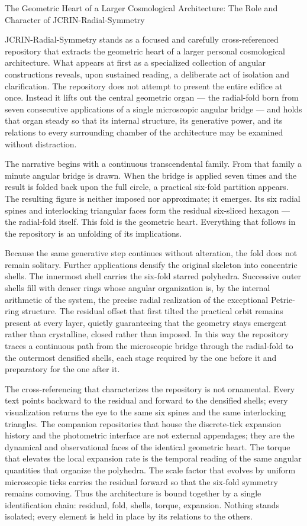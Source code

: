 The Geometric Heart of a Larger Cosmological Architecture: The Role and Character of JCRIN-Radial-Symmetry

JCRIN-Radial-Symmetry stands as a focused and carefully cross-referenced repository that extracts the geometric heart of a larger personal cosmological architecture. What appears at first as a specialized collection of angular constructions reveals, upon sustained reading, a deliberate act of isolation and clarification. The repository does not attempt to present the entire edifice at once. Instead it lifts out the central geometric organ — the radial-fold born from seven consecutive applications of a single microscopic angular bridge — and holds that organ steady so that its internal structure, its generative power, and its relations to every surrounding chamber of the architecture may be examined without distraction.

The narrative begins with a continuous transcendental family. From that family a minute angular bridge is drawn. When the bridge is applied seven times and the result is folded back upon the full circle, a practical six-fold partition appears. The resulting figure is neither imposed nor approximate; it emerges. Its six radial spines and interlocking triangular faces form the residual six-sliced hexagon — the radial-fold itself. This fold is the geometric heart. Everything that follows in the repository is an unfolding of its implications.

Because the same generative step continues without alteration, the fold does not remain solitary. Further applications densify the original skeleton into concentric shells. The innermost shell carries the six-fold starred polyhedra. Successive outer shells fill with denser rings whose angular organization is, by the internal arithmetic of the system, the precise radial realization of the exceptional Petrie-ring structure. The residual offset that first tilted the practical orbit remains present at every layer, quietly guaranteeing that the geometry stays emergent rather than crystalline, closed rather than imposed. In this way the repository traces a continuous path from the microscopic bridge through the radial-fold to the outermost densified shells, each stage required by the one before it and preparatory for the one after it.

The cross-referencing that characterizes the repository is not ornamental. Every text points backward to the residual and forward to the densified shells; every visualization returns the eye to the same six spines and the same interlocking triangles. The companion repositories that house the discrete-tick expansion history and the photometric interface are not external appendages; they are the dynamical and observational faces of the identical geometric heart. The torque that elevates the local expansion rate is the temporal reading of the same angular quantities that organize the polyhedra. The scale factor that evolves by uniform microscopic ticks carries the residual forward so that the six-fold symmetry remains comoving. Thus the architecture is bound together by a single identification chain: residual, fold, shells, torque, expansion. Nothing stands isolated; every element is held in place by its relations to the others.

